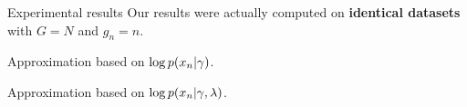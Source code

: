 
\begin{frame}{Experimental results}
    Our results were actually computed on \textbf{identical datasets}
    with $G = N$ and $g_n=n$.

    \begin{center}
    \begin{minipage}{0.25\textwidth}
        Approximation based on $\log p(x_n \vert \gamma)$.

    \end{minipage}
    \begin{minipage}{0.7\textwidth}
        \LowDimAccuracyGraph{}
    \end{minipage}

    \begin{minipage}{0.25\textwidth}
        Approximation based on $\log p(x_n \vert \gamma, \lambda)$.



    \end{minipage}
    \begin{minipage}{0.7\textwidth}
        \HighDimAccuracyGraph{}
    \end{minipage}
\end{center}
\end{frame}



